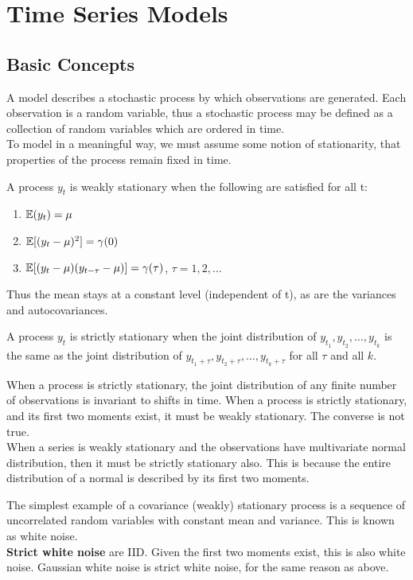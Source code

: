 \documentclass[DIV=14,titlepage=false]{scrreprt}
\begin{document}
\vspace{-10pt}


\chapter{Time Series Models}

\section{Basic Concepts}
A model describes a stochastic process by which observations are generated. Each observation is a random variable, thus a stochastic process may be defined as a collection of random variables which are ordered in time.\\
To model in a meaningful way, we must assume some notion of stationarity, that properties of the process remain fixed in time. 
\begin{definition}
    A process $y_t$ is weakly stationary when the following are satisfied for all t:
    \begin{enumerate}
        \item $\mathbb{E}(y_t) = \mu$ 
        \item $\mathbb{E}[(y_t - \mu)^2] = \gamma(0)$ 
        \item $\mathbb{E}[(y_t - \mu)(y_{t-\tau} - \mu)] = \gamma(\tau)$, \quad $\tau = 1,2,\dots$
    \end{enumerate}
\end{definition}
Thus the mean stays at a constant level (independent of t), as are the variances and autocovariances.
\begin{definition}
    A process $y_t$ is strictly stationary when the joint distribution of $y_{t_1}, y_{t_2}, \dots, y_{t_k}$ is the same as the joint distribution of $y_{t_1 + \tau}, y_{t_2 + \tau}, \dots, y_{t_k + \tau}$ for all $\tau$ and all $k$.
\end{definition}
When a process is strictly stationary, the joint distribution of any finite number of observations is invariant to shifts in time. When a process is strictly stationary, and its first two moments exist, it must be weakly stationary. The converse is not true.\\
When a series is weakly stationary and the observations have multivariate normal distribution, then it must be strictly stationary also. This is because the entire distribution of a normal is described by its first two moments.
\begin{example}
    The simplest example of a covariance (weakly) stationary process is a sequence of uncorrelated random variables with constant mean and variance. This is known as white noise.\\
    \textbf{Strict white noise} are IID. Given the first two moments exist, this is also white noise. Gaussian white noise is strict white noise, for the same reason as above.
\end{example}
\end{document}
